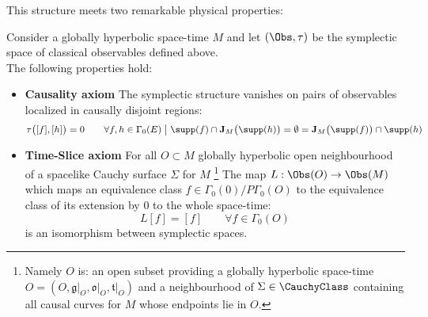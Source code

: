 \documentclass[Main]{subfiles}
\begin{document}
				This structure meets two remarkable physical properties:
				\begin{theorem}\label{Teo:CausalityTimeSliceAxioms}
					Consider a globally hyperbolic space-time $M$ and let $(\Obs,\tau)$ be the symplectic space of classical observables defined above.\\
					The following properties hold:
					\begin{itemize}
						\item \textbf{Causality axiom}
							The symplectic structure vanishes on pairs of observables localized in causally disjoint regions:
							\begin{displaymath}
								\tau \big( [f],[h] \big) =0 \qquad
								\forall f,h \in \Gamma_0(E) \; \big\vert \; \supp(f) \cap \textbf{J}_M \big(\supp(h) \big) = \emptyset = 
								\textbf{J}_M \big(\supp(f) \big) \cap \supp(h)
							\end{displaymath}
						\item \textbf{Time-Slice axiom}
							For all $O \subset M$ globally hyperbolic open neighbourhood of a spacelike Cauchy surface $\Sigma$ for $M$ \footnote{Namely $O$ is: an open subset providing a globally hyperbolic space-time $O = (O,\mathfrak{g}\vert_O,\mathfrak{o}\vert_O, \mathfrak{t}\vert_O)$ and a neighbourhood of $\Sigma \in \CauchyClass$ containing all causal curves for $M$ whose endpoints lie in $O$. }
							The map $L : \Obs( O) \rightarrow \Obs(M)$ which maps an equivalence class $ f \in \Gamma_0(0)\big / P \Gamma_0(O)$ to the equivalence class of its extension by $0$ to the whole space-time:
							\begin{displaymath}
							 L[f] = [f] \qquad \forall f \in \Gamma_0(O)
							\end{displaymath}				
							is an isomorphism between symplectic spaces.
					\end{itemize}
				\end{theorem}
\end{document}
